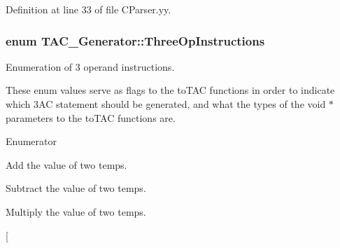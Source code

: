 Definition at line 33 of file C\-Parser.\-yy.

\hypertarget{classTAC__Generator_ae032b80a215a10604c5273b65e7dab4c}{
\subsubsection[{Three\-Op\-Instructions}]{\setlength{\rightskip}{0pt plus 5cm}enum {\bf T\-A\-C\-\_\-\-Generator\-::\-Three\-Op\-Instructions}}}\label{classTAC__Generator_ae032b80a215a10604c5273b65e7dab4c}


Enumeration of 3 operand instructions. 

These enum values serve as flags to the to\-T\-A\-C functions in order to indicate which 3\-A\-C statement should be generated, and what the types of the void $\ast$ parameters to the to\-T\-A\-C functions are. \begin{Desc}
\item[Enumerator]\par
\begin{description}
\item[{\em 
\hypertarget{classTAC__Generator_ae032b80a215a10604c5273b65e7dab4ca53bbfc51b0f492dff408d99b0a5c6f1d}{A\-D\-D}\label{classTAC__Generator_ae032b80a215a10604c5273b65e7dab4ca53bbfc51b0f492dff408d99b0a5c6f1d}
}]Add the value of two temps. \item[{\em 
\hypertarget{classTAC__Generator_ae032b80a215a10604c5273b65e7dab4caf421605e870566ed803e041ea63fc13e}{S\-U\-B}\label{classTAC__Generator_ae032b80a215a10604c5273b65e7dab4caf421605e870566ed803e041ea63fc13e}
}]Subtract the value of two temps. \item[{\em 
\hypertarget{classTAC__Generator_ae032b80a215a10604c5273b65e7dab4ca234829d251fa1caafaf0ccf335d78ffd}{M\-U\-L\-T}\label{classTAC__Generator_ae032b80a215a10604c5273b65e7dab4ca234829d251fa1caafaf0ccf335d78ffd}
}]Multiply the value of two temps. \item[{\em 
}
\end{description}
\end{Desc}
